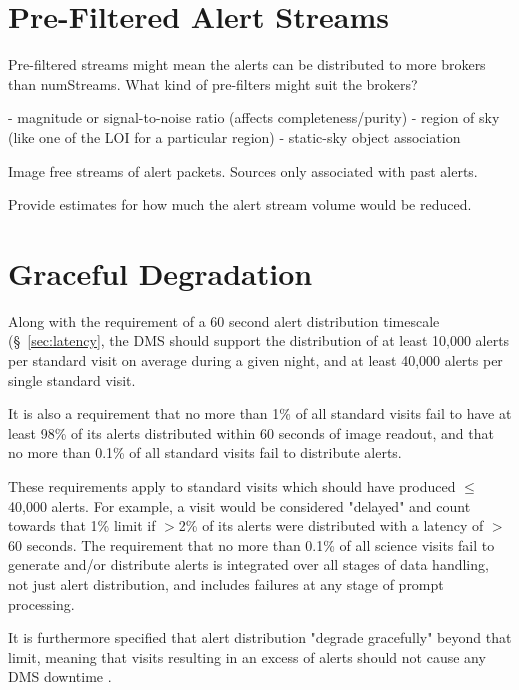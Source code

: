 \documentclass[DM,lsstdraft,authoryear,toc]{lsstdoc}
\begin{document}
\section{Pre-Filtered Alert Streams} \label{sec:prefilter}

Pre-filtered streams might mean the alerts can be distributed to more brokers than numStreams. What kind of pre-filters might suit the brokers?

 - magnitude or signal-to-noise ratio (affects completeness/purity)
 - region of sky (like one of the LOI for a particular region)
 - static-sky object association
 
 Image free streams of alert packets.
 Sources only associated with past alerts.

Provide estimates for how much the alert stream volume would be reduced.

\section{Graceful Degradation} \label{sec:graceful}

Along with the requirement of a 60 second alert distribution timescale (\S~\ref{sec:latency}, the DMS should support the distribution of at least 10,000 alerts per standard visit on average during a given night, and at least 40,000 alerts per single standard visit. 

It is also a requirement that no more than 1\% of all standard visits fail to have at least 98\% of its alerts distributed within 60 seconds of image readout, and that no more than 0.1\% of all standard visits fail to distribute alerts.

These requirements apply to standard visits which should have produced $\leq$40,000 alerts. For example, a visit would be considered "delayed" and count towards that 1\% limit if $>$2\% of its alerts were distributed with a latency of $>$60 seconds. The requirement that no more than 0.1\% of all science visits fail to generate and/or distribute alerts is integrated over all stages of data handling, not just alert distribution, and includes failures at any stage of prompt processing.

It is furthermore specified that alert distribution "degrade gracefully" beyond that limit, meaning that visits resulting in an excess of alerts should not cause any DMS downtime .
\end{document}
